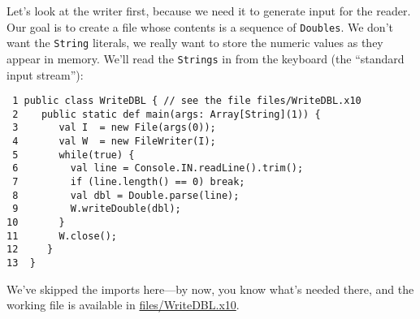 Let's look at the writer first, because we need it to generate input for the
reader.  Our goal is to create a file whose contents is a sequence of 
{\tt Doubles}.  We don't want the {\tt String} literals, we really want to store
the numeric values as they appear in memory.  We'll read the {\tt Strings} in
from the keyboard (the ``standard input stream''):
\begin{verbatim}
 1 public class WriteDBL { // see the file files/WriteDBL.x10
 2    public static def main(args: Array[String](1)) {
 3       val I  = new File(args(0));
 4       val W  = new FileWriter(I);
 5       while(true) {
 6         val line = Console.IN.readLine().trim();
 7         if (line.length() == 0) break;
 8         val dbl = Double.parse(line);
 9         W.writeDouble(dbl);
10       }
11       W.close();
12     } 
13  }
\end{verbatim}
We've skipped the imports here---by now, you know what's needed there, and the
working file is available in
\href{http://dist.codehaus.org/x10/documentation/guide/src/files/WriteDBL.x10}{files/WriteDBL.x10}.
